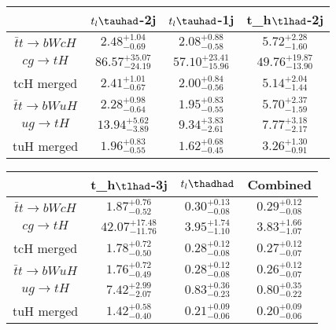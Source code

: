 \centering
\begin{tabular}{|c|c|c|c|} \hline
 & $t_l\tauhad$-2j & $t_l\tauhad$-1j & t_h$\tlhad$-2j\\\hline
$\bar{t}t\to bWcH$ & $2.48^{+1.04}_{-0.69}$ & $2.08^{+0.88}_{-0.58}$ & $5.72^{+2.28}_{-1.60}$\\\hline
$cg\to tH$ & $86.57^{+35.07}_{-24.19}$ & $57.10^{+23.41}_{-15.96}$ & $49.76^{+19.87}_{-13.90}$\\\hline
tcH merged & $2.41^{+1.01}_{-0.67}$ & $2.00^{+0.84}_{-0.56}$ & $5.14^{+2.04}_{-1.44}$\\\hline
$\bar{t}t\to bWuH$ & $2.28^{+0.98}_{-0.64}$ & $1.95^{+0.83}_{-0.55}$ & $5.70^{+2.37}_{-1.59}$\\\hline
$ug\to tH$ & $13.94^{+5.62}_{-3.89}$ & $9.34^{+3.83}_{-2.61}$ & $7.77^{+3.18}_{-2.17}$\\\hline
tuH merged & $1.96^{+0.83}_{-0.55}$ & $1.62^{+0.68}_{-0.45}$ & $3.26^{+1.30}_{-0.91}$\\\hline
\end{tabular}
\begin{tabular}{|c|c|c|c|} \hline
 & t_h$\tlhad$-3j & $t_l\thadhad$ & Combined\\\hline
$\bar{t}t\to bWcH$ & $1.87^{+0.76}_{-0.52}$ & $0.30^{+0.13}_{-0.08}$ & $0.29^{+0.12}_{-0.08}$\\\hline
$cg\to tH$ & $42.07^{+17.48}_{-11.76}$ & $3.95^{+1.74}_{-1.10}$ & $3.83^{+1.66}_{-1.07}$\\\hline
tcH merged & $1.78^{+0.72}_{-0.50}$ & $0.28^{+0.12}_{-0.08}$ & $0.27^{+0.12}_{-0.07}$\\\hline
$\bar{t}t\to bWuH$ & $1.76^{+0.72}_{-0.49}$ & $0.28^{+0.12}_{-0.08}$ & $0.26^{+0.12}_{-0.07}$\\\hline
$ug\to tH$ & $7.42^{+2.99}_{-2.07}$ & $0.83^{+0.36}_{-0.23}$ & $0.80^{+0.35}_{-0.22}$\\\hline
tuH merged & $1.42^{+0.58}_{-0.40}$ & $0.21^{+0.09}_{-0.06}$ & $0.20^{+0.09}_{-0.06}$\\\hline
\end{tabular}
